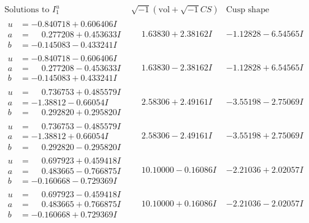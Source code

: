 \documentclass[1p]{elsarticle_modified}
\theoremstyle{definition}
\newcommand{\I}{\sqrt{-1}}
\begin{document}
$$\begin{array}{c|c|c}  
\text{Solutions to }I^u_{1}& \I (\text{vol} + \sqrt{-1}CS) & \text{Cusp shape}\\
 \hline 
\begin{aligned}
u &= -0.840718 + 0.606406 I \\
a &= \phantom{-}0.277208 + 0.453633 I \\
b &= -0.145083 - 0.433241 I\end{aligned}
 & \phantom{-}1.63830 + 2.38162 I & -1.12828 - 6.54565 I \\ \hline\begin{aligned}
u &= -0.840718 - 0.606406 I \\
a &= \phantom{-}0.277208 - 0.453633 I \\
b &= -0.145083 + 0.433241 I\end{aligned}
 & \phantom{-}1.63830 - 2.38162 I & -1.12828 + 6.54565 I \\ \hline\begin{aligned}
u &= \phantom{-}0.736753 + 0.485579 I \\
a &= -1.38812 - 0.66054 I \\
b &= \phantom{-}0.292820 + 0.295820 I\end{aligned}
 & \phantom{-}2.58306 + 2.49161 I & -3.55198 - 2.75069 I \\ \hline\begin{aligned}
u &= \phantom{-}0.736753 - 0.485579 I \\
a &= -1.38812 + 0.66054 I \\
b &= \phantom{-}0.292820 - 0.295820 I\end{aligned}
 & \phantom{-}2.58306 - 2.49161 I & -3.55198 + 2.75069 I \\ \hline\begin{aligned}
u &= \phantom{-}0.697923 + 0.459418 I \\
a &= \phantom{-}0.483665 - 0.766875 I \\
b &= -0.160668 - 0.729369 I\end{aligned}
 & \phantom{-}10.10000 - 0.16086 I & -2.21036 + 2.02057 I \\ \hline\begin{aligned}
u &= \phantom{-}0.697923 - 0.459418 I \\
a &= \phantom{-}0.483665 + 0.766875 I \\
b &= -0.160668 + 0.729369 I\end{aligned}
 & \phantom{-}10.10000 + 0.16086 I & -2.21036 - 2.02057 I \\ \hline\begin{aligned}

\end{aligned}
\end{array}$$
\end{document}
